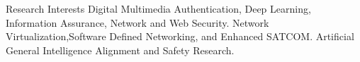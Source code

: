\begin{rubric}{Research Interests}
    \entry*[]
    Digital Multimedia Authentication, Deep Learning, Information Assurance, Network and Web Security.
    \entry*[]
    Network Virtualization,Software Defined Networking, and Enhanced SATCOM. 
    \entry*[]
    Artificial General Intelligence Alignment and Safety Research.
\end{rubric}